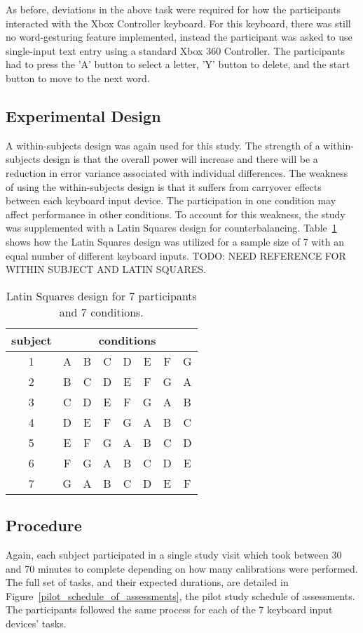 As before, deviations in the above task were required for how the participants interacted with the Xbox Controller keyboard. For this keyboard, there was still no word-gesturing feature implemented, instead the participant was asked to use single-input text entry using a standard Xbox 360 Controller. The participants had to press the 'A' button to select a letter, 'Y' button to delete, and the start button to move to the next word.

\subsection{Experimental Design} \label{pilot_experimental_design}
A within-subjects design was again used for this study. The strength of a within-subjects design is that the overall power will increase and there will be a reduction in error variance associated with individual differences. The weakness of using the within-subjects design is that it suffers from carryover effects between each keyboard input device. The participation in one condition may affect performance in other conditions. To account for this weakness, the study was supplemented with a Latin Squares design for counterbalancing. Table~\ref{pilot_latin_squares} shows how the Latin Squares design was utilized for a sample size of 7 with an equal number of different keyboard inputs. TODO: NEED REFERENCE FOR WITHIN SUBJECT AND LATIN SQUARES.

\begin{table}[h] %
	\centering
	\caption[Latin Squares Example]{\centering Latin Squares design for 7 participants and 7 conditions.}
	\label{pilot_latin_squares}
	\begin{tabular}{c | c c c c c c c}
		\hline
		subject & \multicolumn{7}{c}{conditions} \\
		\hline
		1 & A & B & C & D & E & F & G \\
		2 & B & C & D & E & F & G & A \\
		3 & C & D & E & F & G & A & B \\
		4 & D & E & F & G & A & B & C \\
		5 & E & F & G & A & B & C & D \\
		6 & F & G & A & B & C & D & E \\
		7 & G & A & B & C & D & E & F \\
		\hline
	\end{tabular}
\end{table}

\subsection{Procedure} \label{pilot_procedure}
Again, each subject participated in a single study visit which took between 30 and 70 minutes to complete depending on how many calibrations were performed. The full set of tasks, and their expected durations, are detailed in Figure~\ref{pilot_schedule_of_assessments}, the pilot study schedule of assessments. The participants followed the same process for each of the 7 keyboard input devices' tasks.

